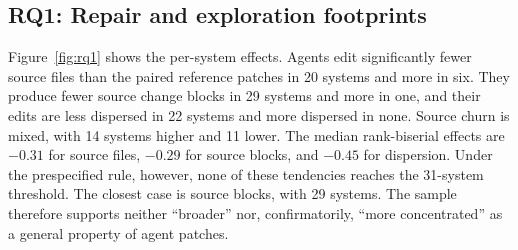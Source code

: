 \documentclass[a4paper,fleqn]{cas-sc}
\begin{document}

\subsection{RQ1: Repair and exploration footprints}\label{sec:rq1}

Figure~\ref{fig:rq1} shows the per-system effects. Agents edit significantly fewer source files than the paired reference patches in 20 systems and more in six. They produce fewer source change blocks in 29 systems and more in one, and their edits are less dispersed in 22 systems and more dispersed in none. Source churn is mixed, with 14 systems higher and 11 lower. The median rank-biserial effects are $-0.31$ for source files, $-0.29$ for source blocks, and $-0.45$ for dispersion. Under the prespecified rule, however, none of these tendencies reaches the 31-system threshold. The closest case is source blocks, with 29 systems. The sample therefore supports neither ``broader'' nor, confirmatorily, ``more concentrated'' as a general property of agent patches.
\end{document}
